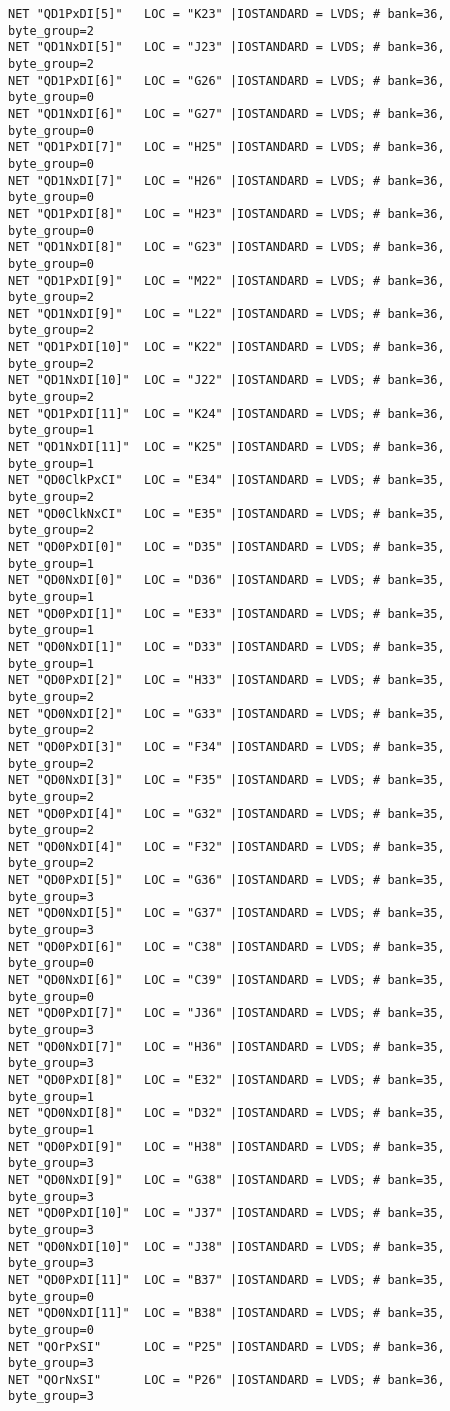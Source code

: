 \begin{appendix}
\begin{verbatim}
NET "QD1PxDI[5]"   LOC = "K23" |IOSTANDARD = LVDS; # bank=36, byte_group=2
NET "QD1NxDI[5]"   LOC = "J23" |IOSTANDARD = LVDS; # bank=36, byte_group=2
NET "QD1PxDI[6]"   LOC = "G26" |IOSTANDARD = LVDS; # bank=36, byte_group=0
NET "QD1NxDI[6]"   LOC = "G27" |IOSTANDARD = LVDS; # bank=36, byte_group=0
NET "QD1PxDI[7]"   LOC = "H25" |IOSTANDARD = LVDS; # bank=36, byte_group=0
NET "QD1NxDI[7]"   LOC = "H26" |IOSTANDARD = LVDS; # bank=36, byte_group=0
NET "QD1PxDI[8]"   LOC = "H23" |IOSTANDARD = LVDS; # bank=36, byte_group=0
NET "QD1NxDI[8]"   LOC = "G23" |IOSTANDARD = LVDS; # bank=36, byte_group=0
NET "QD1PxDI[9]"   LOC = "M22" |IOSTANDARD = LVDS; # bank=36, byte_group=2
NET "QD1NxDI[9]"   LOC = "L22" |IOSTANDARD = LVDS; # bank=36, byte_group=2
NET "QD1PxDI[10]"  LOC = "K22" |IOSTANDARD = LVDS; # bank=36, byte_group=2
NET "QD1NxDI[10]"  LOC = "J22" |IOSTANDARD = LVDS; # bank=36, byte_group=2
NET "QD1PxDI[11]"  LOC = "K24" |IOSTANDARD = LVDS; # bank=36, byte_group=1
NET "QD1NxDI[11]"  LOC = "K25" |IOSTANDARD = LVDS; # bank=36, byte_group=1
NET "QD0ClkPxCI"   LOC = "E34" |IOSTANDARD = LVDS; # bank=35, byte_group=2
NET "QD0ClkNxCI"   LOC = "E35" |IOSTANDARD = LVDS; # bank=35, byte_group=2
NET "QD0PxDI[0]"   LOC = "D35" |IOSTANDARD = LVDS; # bank=35, byte_group=1
NET "QD0NxDI[0]"   LOC = "D36" |IOSTANDARD = LVDS; # bank=35, byte_group=1
NET "QD0PxDI[1]"   LOC = "E33" |IOSTANDARD = LVDS; # bank=35, byte_group=1
NET "QD0NxDI[1]"   LOC = "D33" |IOSTANDARD = LVDS; # bank=35, byte_group=1
NET "QD0PxDI[2]"   LOC = "H33" |IOSTANDARD = LVDS; # bank=35, byte_group=2
NET "QD0NxDI[2]"   LOC = "G33" |IOSTANDARD = LVDS; # bank=35, byte_group=2
NET "QD0PxDI[3]"   LOC = "F34" |IOSTANDARD = LVDS; # bank=35, byte_group=2
NET "QD0NxDI[3]"   LOC = "F35" |IOSTANDARD = LVDS; # bank=35, byte_group=2
NET "QD0PxDI[4]"   LOC = "G32" |IOSTANDARD = LVDS; # bank=35, byte_group=2
NET "QD0NxDI[4]"   LOC = "F32" |IOSTANDARD = LVDS; # bank=35, byte_group=2
NET "QD0PxDI[5]"   LOC = "G36" |IOSTANDARD = LVDS; # bank=35, byte_group=3
NET "QD0NxDI[5]"   LOC = "G37" |IOSTANDARD = LVDS; # bank=35, byte_group=3
NET "QD0PxDI[6]"   LOC = "C38" |IOSTANDARD = LVDS; # bank=35, byte_group=0
NET "QD0NxDI[6]"   LOC = "C39" |IOSTANDARD = LVDS; # bank=35, byte_group=0
NET "QD0PxDI[7]"   LOC = "J36" |IOSTANDARD = LVDS; # bank=35, byte_group=3
NET "QD0NxDI[7]"   LOC = "H36" |IOSTANDARD = LVDS; # bank=35, byte_group=3
NET "QD0PxDI[8]"   LOC = "E32" |IOSTANDARD = LVDS; # bank=35, byte_group=1
NET "QD0NxDI[8]"   LOC = "D32" |IOSTANDARD = LVDS; # bank=35, byte_group=1
NET "QD0PxDI[9]"   LOC = "H38" |IOSTANDARD = LVDS; # bank=35, byte_group=3
NET "QD0NxDI[9]"   LOC = "G38" |IOSTANDARD = LVDS; # bank=35, byte_group=3
NET "QD0PxDI[10]"  LOC = "J37" |IOSTANDARD = LVDS; # bank=35, byte_group=3
NET "QD0NxDI[10]"  LOC = "J38" |IOSTANDARD = LVDS; # bank=35, byte_group=3
NET "QD0PxDI[11]"  LOC = "B37" |IOSTANDARD = LVDS; # bank=35, byte_group=0
NET "QD0NxDI[11]"  LOC = "B38" |IOSTANDARD = LVDS; # bank=35, byte_group=0
NET "QOrPxSI"      LOC = "P25" |IOSTANDARD = LVDS; # bank=36, byte_group=3
NET "QOrNxSI"      LOC = "P26" |IOSTANDARD = LVDS; # bank=36, byte_group=3
\end{verbatim}
\end{appendix}
